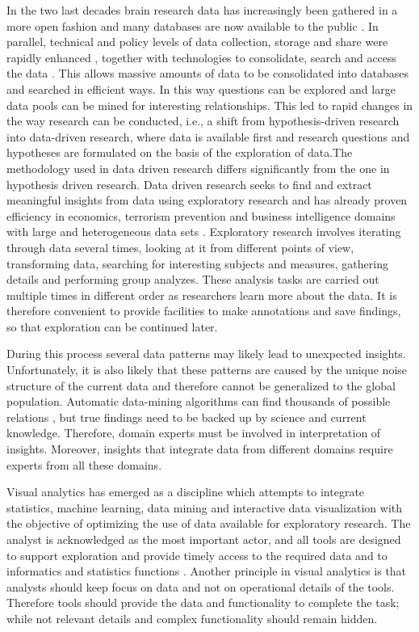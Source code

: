 \documentclass[twocolumn]{svjour3}
\begin{document}
In the two last decades brain research data has increasingly been gathered in a more open fashion and many databases are now available to the public \cite{milham_open_2012}. In parallel, technical and policy levels of data collection, storage and share were rapidly enhanced \cite{eckersley_neuroscience_2003}, together with technologies to consolidate, search and access the data \cite{van_horn_is_2009}\cite{wood_harnessing_2014}. 
This allows massive amounts of data to be consolidated into databases and searched in efficient ways.  In this way questions can be explored and large data pools can be mined for interesting relationships. This led to rapid changes in the way research can be conducted, i.e., a shift from hypothesis-driven research into data-driven research, where data is available first and research questions and hypotheses are formulated on the basis of the exploration of data.The methodology used in data driven research differs significantly from the one in hypothesis driven research. Data driven research seeks to find and extract meaningful insights from data using exploratory research \cite{tukey_we_1980} and has already proven efficiency in economics, terrorism prevention and business intelligence domains with large and heterogeneous data sets \cite{cook_illuminating_2005}. Exploratory research involves iterating through data several times, looking at it from different points of view, transforming data, searching for interesting subjects and measures, gathering details and performing group analyzes. These analysis tasks are carried out multiple times in different order as researchers learn more about the data. It is therefore convenient to provide facilities to make annotations and save findings, so that exploration can be continued later.

During this process several data patterns may likely lead to unexpected insights. Unfortunately, it is also likely that these patterns are caused by the unique noise structure of the current data and therefore cannot be generalized to the global population. Automatic data-mining algorithms can find thousands of possible relations , but true findings need to be backed up by science and current knowledge.  Therefore, domain experts must be involved in interpretation of insights. Moreover, insights that integrate data from different domains require experts from all these domains.

Visual analytics \cite{keim_visual_2008} has emerged as a discipline which attempts to integrate statistics, machine learning, data mining and interactive data visualization with the objective of optimizing the use of data available for exploratory research. The analyst is acknowledged as the most important actor, and all tools are designed to support exploration and provide timely access to the required data and to informatics and statistics functions . Another principle in visual analytics is that analysts should keep focus on data and not on operational details of the tools. Therefore tools should provide the data and functionality to complete the task; while not relevant details and complex functionality should remain hidden. 
					
\end{document}
